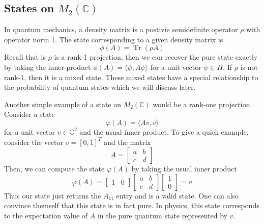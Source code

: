 \subsection{States on \( M_2(\mathbb{C}) \)}
In quantum mechanics, a density matrix is a postivie semidefinite operator $\rho$
with operator norm 1. The state corresponding to a given density matrix is
\begin{equation}
    \phi(A) = \operatorname{Tr}(\rho A)
\end{equation}
Recall that is $\rho$ is a rank-1 projection, then we can recover the pure state exactly
by taking the inner-product $\phi(A) = \langle \psi, A\psi \rangle$ for a unit vector
$\psi \in H$. If $\rho$ is not rank-1, then it is a mixed state. These mixed states
have a special relationship to the probability of quantum states which we will
discuss later.
\par
Another simple example of a state on $M_2(\mathbb{C})$ would be a rank-one projection.
Consider a state
\begin{equation}
    \varphi(A) = \langle Av,v\rangle 
\end{equation}
for a unit vector $v \in \mathbb{C}^2$ and the usual inner-product. To give a quick
example, consider the vector $v = [0, 1]^T$ and the matrix
\begin{equation*}
    A = 
    \begin{bmatrix}
        a & b\\
        c & d
    \end{bmatrix}
\end{equation*}
Then, we can compute the state $\varphi(A)$ by taking the usual inner product
\begin{equation}
    \varphi(A) = 
    \begin{bmatrix}
        1 & 0
    \end{bmatrix}
    \begin{bmatrix}
        a & b\\
        c & d
    \end{bmatrix}
    \begin{bmatrix}
        1\\
        0
    \end{bmatrix}
    = a
\end{equation}
Thus our state just returns the $A_{11}$ entry and is a valid state. One can also
convince themself that this state is in fact pure. In physics, this state corresponds to the
expectation value of $A$ in the pure quantum state represented by $v$.


